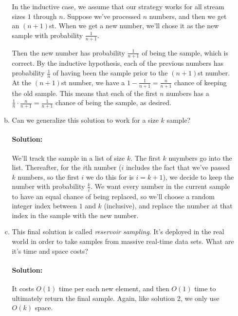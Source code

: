 \documentclass{article}
\begin{document}
\begin{enumerate}[1.]
\begin{enumerate}[a.]
    In the inductive case, we assume that our strategy works for all stream
    sizes $1$ through $n$. Suppose we've processed $n$ numbers, and then we get
    an $(n+1)$st. When we get a new number, we'll chose it as the new sample
    with probability $\frac{1}{n+1}$.

    Then the new number has probability $\frac{1}{n+1}$ of being the sample,
    which is correct. By the inductive hypothesis, each of the previous numbers
    has probability $\frac{1}{n}$ of having been the sample prior to the
    $(n+1)$st number. At the $(n+1)$st number, we have a $1 - \frac{1}{n + 1} =
    \frac{n}{n+1}$ chance of keeping the old sample. This means that each of the
    first $n$ numbers has a $\frac{1}{n} \cdot \frac{n}{n+1} = \frac{1}{n+1}$
    chance of being the sample, as desired.

  \item %
    Can we generalize this solution to work for a size $k$ sample?

    \paragraph{Solution:} We'll track the sample in a list of size $k$. The
    first $k$ nuymbers go into the list. Thereafter, for the $i$th number ($i$
    includes the fact that we've passed $k$ numbers, so the first $i$ we do this
    for is $i = k + 1$), we decide to keep the number with probability
    $\frac{k}{i}$. We want every number in the current sample to have an equal
    chance of being replaced, so we'll choose a random integer index between $1$
    and $k$ (inclusive), and replace the number at that index in the sample with
    the new number.

  \item %
    This final solution is called \textit{reservoir sampling}. It's deployed
    in the real world in order to take samples from massive real-time data sets.
    What are it's time and space costs?

    \paragraph{Solution:} It costs $O(1)$ time per each new element, and then
    $O(1)$ time to ultimately return the final sample. Again, like solution 2,
    we only use $O(k)$ space.

  \end{enumerate}
\end{enumerate}
\end{document}
